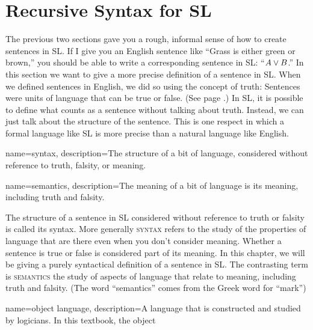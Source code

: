 \label{recursive_syntax_for_SL}

\section{Recursive Syntax for SL} %

The previous two sections gave you a rough, informal sense of how to create sentences in SL. If I give you an English sentence like ``Grass is either green or brown,'' you should be able to write a corresponding sentence in SL: ``$A \lor B$.'' In this section we want to give a more precise definition of a sentence in SL.  When we defined sentences in English, we did so using the concept of truth: Sentences were units of language that can be true or false. (See page \pageref{def:statement}.) In SL, it is possible to define what counts as a sentence without talking about truth. Instead, we can just talk about the structure of the sentence. This is one respect in which a formal language like SL is more precise than a natural language like English.

{
name=syntax,
description={The structure of a bit of language, considered without reference to truth, falsity, or meaning.}
}

{
name=semantics,
description={The meaning of a bit of language is its meaning, including truth and falsity.}
}

The structure of a sentence in SL considered without reference to truth or falsity is called its syntax. More generally \textsc{\gls{syntax}} \label{def:syntax} refers to the study of the properties of language that are there even when you don't consider meaning. Whether a sentence is true or false is considered part of its meaning. In this chapter, we will be giving a purely syntactical definition of a sentence in SL.  The contrasting term is \textsc{\gls{semantics}} \label{def:semantics} the study of aspects of language that relate to meaning, including truth and falsity. (The word ``semantics'' comes from the Greek word for ``mark'')

{
name=object language,
description={A language that is constructed and studied by logicians. In this textbook, the object }
}


